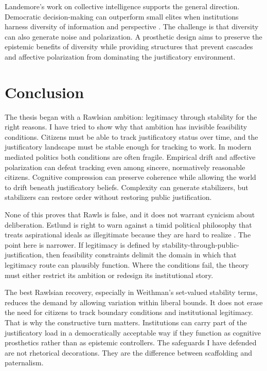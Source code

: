 \documentclass[12pt]{article}
\begin{document}
Landemore's work on collective intelligence supports the general direction. Democratic decision-making can outperform small elites when institutions harness diversity of information and perspective \parencite[pp.~3--4]{landemore2013democratic}. The challenge is that diversity can also generate noise and polarization. A prosthetic design aims to preserve the epistemic benefits of diversity while providing structures that prevent cascades and affective polarization from dominating the justificatory environment.

\section{Conclusion}

The thesis began with a Rawlsian ambition: legitimacy through stability for the right reasons. I have tried to show why that ambition has invisible feasibility conditions. Citizens must be able to track justificatory status over time, and the justificatory landscape must be stable enough for tracking to work. In modern mediated politics both conditions are often fragile. Empirical drift and affective polarization can defeat tracking even among sincere, normatively reasonable citizens. Cognitive compression can preserve coherence while allowing the world to drift beneath justificatory beliefs. Complexity can generate stabilizers, but stabilizers can restore order without restoring public justification.

None of this proves that Rawls is false, and it does not warrant cynicism about deliberation. Estlund is right to warn against a timid political philosophy that treats aspirational ideals as illegitimate because they are hard to realize \parencite[pp.~10--12]{estlund2019utopophobia}. The point here is narrower. If legitimacy is defined by stability-through-public-justification, then feasibility constraints delimit the domain in which that legitimacy route can plausibly function. Where the conditions fail, the theory must either restrict its ambition or redesign its institutional story.

The best Rawlsian recovery, especially in Weithman's set-valued stability terms, reduces the demand by allowing variation within liberal bounds. It does not erase the need for citizens to track boundary conditions and institutional legitimacy. That is why the constructive turn matters. Institutions can carry part of the justificatory load in a democratically acceptable way if they function as cognitive prosthetics rather than as epistemic controllers. The safeguards I have defended are not rhetorical decorations. They are the difference between scaffolding and paternalism.
\end{document}
